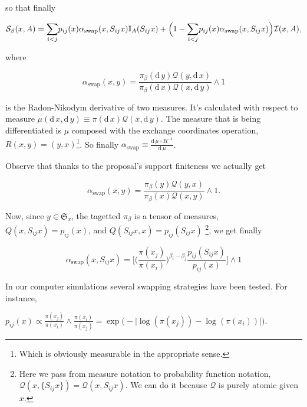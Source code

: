 so that finally

\begin{equation*}
	\mathcal{S}_{\beta}(x,A) = \underset{ i < j}{\sum} p_{ij}(x) \alpha_\text{swap} (x, S_{ij}x) \mathbb{I}_A(S_{ij} x) + \Big( 1 - \underset{ i < j}{\sum} p_{ij}(x) \alpha_\text{swap} (x, S_{ij}x)\Big) \mathcal{I}(x,A),
\end{equation*}	

where 

	$$\alpha_\text{swap}(x,y) = \frac{\pi_\beta( \mathrm{d}\, y ) \mathcal{Q}(y, \mathrm{d}\,x)}{\pi_\beta( \mathrm{d}\, x ) \mathcal{Q}(x, \mathrm{d}\,y)} \wedge 1$$

is the Radon-Nikodym derivative of two measures. It's calculated with respect to measure $ \mu (\mathrm{d}\,x, \mathrm{d}\,y) \equiv \pi(\mathrm{d}\,x) \mathcal{Q}(x, \mathrm{d}\,y)$. The measure that is being differentiated is $\mu$ composed with the exchange coordinates operation, $R(x,y) = (y,x)$\footnote{Which is obviously measurable in the appropriate sense.}. So finally $\alpha_\text{swap} \equiv \frac{\mathrm{d}\, \mu \circ R^{-1}}{\mathrm{d}\, \mu}$.

Observe that thanks to the proposal's support finiteness we actually get 

	$$\alpha_\text{swap}(x,y) =  \frac{\pi_\beta( y ) \mathcal{Q}(y, x)}{\pi_\beta( x ) \mathcal{Q}(x, y)} \wedge 1.$$


Now, since $y \in \mathfrak{S}_x $, the tagetted $\pi_\beta$ is a tensor of measures, $Q(x, S_{ij} x) = p_{ij}(x)$, and $Q( S_{ij} x, x) = p_{ij}(S_{ij}x)$ \footnote{Here we pass from measure notation to probability function notation, $\mathcal{Q}(x, \{S_{ij}x \}) = \mathcal{Q}(x, S_{ij}x)$. We can do it because $\mathcal{Q}$ is purely atomic given $x$.}, we get finally 

\begin{equation*}
	\alpha_\text{swap}(x,S_{ij} x) = \Big[  \Big(\frac{\pi(x_j)}{\pi(x_i)} \Big)^{\beta_i - \beta_j}  \frac{ p_{ij}(S_{ij} x )}{ p_{ij}( x ) }\Big] \wedge 1
\end{equation*}	

In our computer simulations several swapping strategies have been tested. For instance,

\begin{strategy}
	\item 
		$
			p_{ij}(x) \propto 
			\frac{\pi (x_j)}{\pi( x_i )} \wedge \frac{\pi (x_i)}{\pi( x_j )} = 
			\exp \Big( - \big| \log ( \pi(x_j) ) - \log ( \pi(x_i) ) \big| \Big).
		$\label{strat1} 
\end{strategy}

